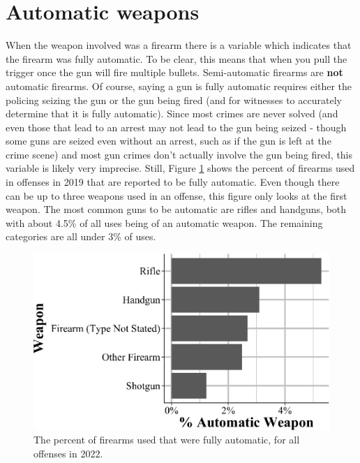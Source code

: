 \documentclass[
  12pt,
  openany]{book}
\begin{document}
\section{Automatic weapons}\label{automatic-weapons}

When the weapon involved was a firearm there is a variable which indicates that the firearm was fully automatic. To be clear, this means that when you pull the trigger once the gun will fire multiple bullets. Semi-automatic firearms are \textbf{not} automatic firearms. Of course, saying a gun is fully automatic requires either the policing seizing the gun or the gun being fired (and for witnesses to accurately determine that it is fully automatic). Since most crimes are never solved (and even those that lead to an arrest may not lead to the gun being seized - though some guns are seized even without an arrest, such as if the gun is left at the crime scene) and most gun crimes don't actually involve the gun being fired, this variable is likely very imprecise. Still, Figure \ref{fig:offenseAutomaticWeapon} shows the percent of firearms used in offenses in 2019 that are reported to be fully automatic. Even though there can be up to three weapons used in an offense, this figure only looks at the first weapon. The most common guns to be automatic are rifles and handguns, both with about 4.5\% of all uses being of an automatic weapon. The remaining categories are all under 3\% of uses.

\begin{figure}

{\centering \includegraphics[width=0.9\linewidth]{13_nibrs_offense_files/figure-latex/offenseAutomaticWeapon-1} 

}

\caption{The percent of firearms used that were fully automatic, for all offenses in 2022.}\label{fig:offenseAutomaticWeapon}
\end{figure}
\end{document}
